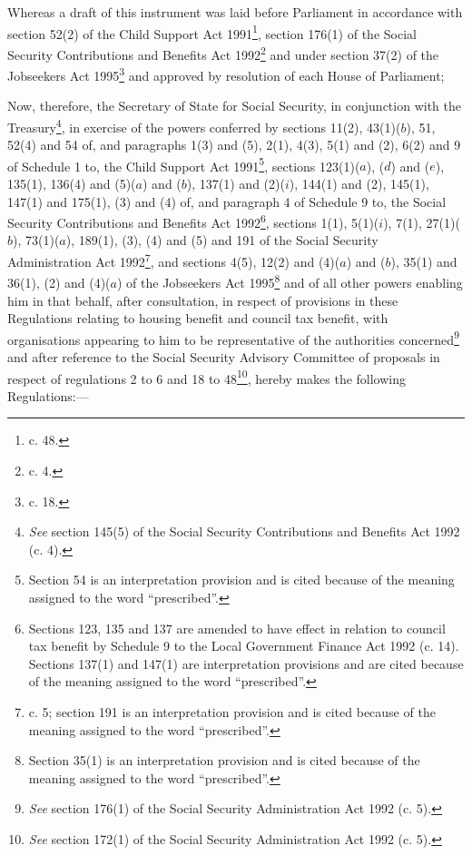 \documentclass[12pt,a4paper]{article}
\title{\regstitle}
\author{S.I. 1996 No. 1803}
\date{Made 8th July 1996\\Coming into force in accordance with regulation 1
}
\begin{document}
\maketitle

\noindent
Whereas a draft of this instrument was laid before Parliament in accordance with section 52(2) of the Child Support Act 1991\footnote{ c. 48.}, section 176(1) of the Social Security Contributions and Benefits Act 1992\footnote{ c. 4.} and under section 37(2) of the Jobseekers Act 1995\footnote{ c. 18.} and approved by resolution of each House of Parliament;

 Now, therefore, the Secretary of State for Social Security, in conjunction with the Treasury\footnote{\frenchspacing \emph{See} section 145(5) of the Social Security Contributions and Benefits Act 1992 (c. 4).}, in exercise of the powers conferred by sections 11(2), 43(1)($b$), 51, 52(4) and 54 of, and paragraphs 1(3) and (5), 2(1), 4(3), 5(1) and (2), 6(2) and 9 of Schedule 1 to, the Child Support Act 1991\footnote{\frenchspacing Section 54 is an interpretation provision and is cited because of the meaning assigned to the word “prescribed”.}, sections 123(1)($a$), ($d$) and ($e$), 135(1), 136(4) and (5)($a$) and ($b$), 137(1) and (2)($i$), 144(1) and (2), 145(1), 147(1) and 175(1), (3) and (4) of, and paragraph 4 of Schedule 9 to, the Social Security Contributions and Benefits Act 1992\footnote{\frenchspacing Sections 123, 135 and 137 are amended to have effect in relation to council tax benefit by Schedule 9 to the Local Government Finance Act 1992 (c. 14). Sections 137(1) and 147(1) are interpretation provisions and are cited because of the meaning assigned to the word “prescribed”.}, sections 1(1), 5(1)($i$), 7(1), 27(1)($b$), 73(1)($a$), 189(1), (3), (4) and (5) and 191 of the Social Security Administration Act 1992\footnote{ c. 5; section 191 is an interpretation provision and is cited because of the meaning assigned to the word “prescribed”.}, and sections 4(5), 12(2) and (4)($a$) and ($b$), 35(1) and 36(1), (2) and (4)($a$) of the Jobseekers Act 1995\footnote{\frenchspacing Section 35(1) is an interpretation provision and is cited because of the meaning assigned to the word “prescribed”.} and of all other powers enabling him in that behalf, after consultation, in respect of provisions in these Regulations relating to housing benefit and council tax benefit, with organisations appearing to him to be representative of the authorities concerned\footnote{\frenchspacing \emph{See} section 176(1) of the Social Security Administration Act 1992 (c. 5).} and after reference to the Social Security Advisory Committee of proposals in respect of regulations 2 to 6 and 18 to 48\footnote{\frenchspacing \emph{See} section 172(1) of the Social Security Administration Act 1992 (c. 5).}, hereby makes the following Regulations:—
\end{document}
